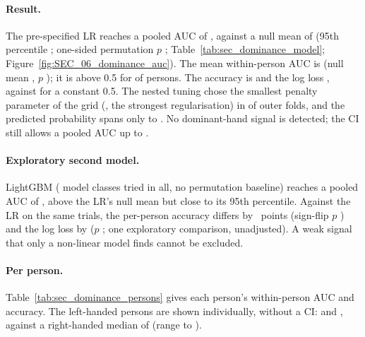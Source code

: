 \paragraph{Result.} The pre-specified LR reaches a pooled AUC of , against a null mean of
 (95th percentile ; one-sided permutation $p$
; Table~\ref{tab:sec_dominance_model}; Figure~\ref{fig:SEC_06_dominance_auc}). The mean
within-person AUC is  (null mean , $p$ );
it is above 0.5 for  of  persons. The accuracy is
 and the log loss , against  for a constant 0.5. The nested
tuning chose the smallest penalty parameter of the grid (, the strongest regularisation) in
 of  outer folds, and the predicted probability spans only
 to . No dominant-hand signal is detected; the CI still allows a pooled AUC up to
.

\paragraph{Exploratory second model.} LightGBM ( model classes tried in all, no permutation
baseline) reaches a pooled AUC of , above the LR's null mean but close to its 95th percentile.
Against the LR on the same trials, the per-person accuracy differs by ~points (sign-flip
$p$ ) and the log loss by  ($p$ ; one
exploratory comparison, unadjusted). A weak signal that only a non-linear model finds cannot be excluded.

\paragraph{Per person.} Table~\ref{tab:sec_dominance_persons} gives each person's within-person AUC and accuracy.
The left-handed persons are shown individually, without a CI:   and
 , against a right-handed median of  (range
 to ).


